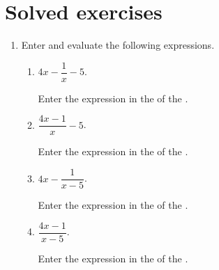 \section{Solved exercises}
\begin{enumerate}
\item Enter and evaluate the following expressions.
      \begin{enumerate}
      \item $4x-\dfrac{1}{x}-5$.
            \begin{indication}
            Enter the expression  in the  of the .
            \end{indication}
      \item $\dfrac{4x-1}{x}-5$.
            \begin{indication}
            Enter the expression  in the  of the .
            \end{indication}
      \item $4x-\dfrac{1}{x-5}$.
            \begin{indication}
            Enter the expression  in the  of the .
            \end{indication}
      \item $\dfrac{4x-1}{x-5}$.
            \begin{indication}
            Enter the expression  in the  of the .
            \end{indication}
      \end{enumerate}


\end{enumerate}
